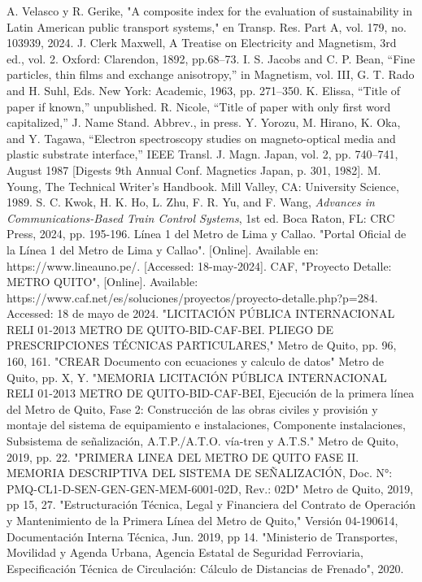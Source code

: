 \documentclass[conference]{IEEEtran}
\begin{document}
\begin{thebibliography}{00}
 A. Velasco y R. Gerike, "A composite index for the evaluation of sustainability in Latin American public transport systems," en Transp. Res. Part A, vol. 179, no. 103939, 2024. 
 J. Clerk Maxwell, A Treatise on Electricity and Magnetism, 3rd ed., vol. 2. Oxford: Clarendon, 1892, pp.68--73.
 I. S. Jacobs and C. P. Bean, ``Fine particles, thin films and exchange anisotropy,'' in Magnetism, vol. III, G. T. Rado and H. Suhl, Eds. New York: Academic, 1963, pp. 271--350.
 K. Elissa, ``Title of paper if known,'' unpublished.
 R. Nicole, ``Title of paper with only first word capitalized,'' J. Name Stand. Abbrev., in press.
 Y. Yorozu, M. Hirano, K. Oka, and Y. Tagawa, ``Electron spectroscopy studies on magneto-optical media and plastic substrate interface,'' IEEE Transl. J. Magn. Japan, vol. 2, pp. 740--741, August 1987 [Digests 9th Annual Conf. Magnetics Japan, p. 301, 1982].
 M. Young, The Technical Writer's Handbook. Mill Valley, CA: University Science, 1989.
 S. C. Kwok, H. K. Ho, L. Zhu, F. R. Yu, and F. Wang, \textit{Advances in Communications-Based Train Control Systems}, 1st ed. Boca Raton, FL: CRC Press, 2024, pp. 195-196.
 Línea 1 del Metro de Lima y Callao. "Portal Oficial de la Línea 1 del Metro de Lima y Callao". [Online]. Available en: https://www.lineauno.pe/. [Accessed: 18-may-2024].
 CAF, "Proyecto Detalle: METRO QUITO", [Online]. Available: https://www.caf.net/es/soluciones/proyectos/proyecto-detalle.php?p=284. Accessed: 18 de mayo de 2024.
 "LICITACIÓN PÚBLICA INTERNACIONAL RELI 01-2013 METRO DE QUITO-BID-CAF-BEI. PLIEGO DE PRESCRIPCIONES TÉCNICAS PARTICULARES," Metro de Quito, pp. 96, 160, 161.
 "CREAR Documento con ecuaciones y calculo de datos" Metro de Quito, pp. X, Y.
 "MEMORIA LICITACIÓN PÚBLICA INTERNACIONAL RELI 01-2013 METRO DE QUITO-BID-CAF-BEI, Ejecución de la primera línea del Metro de Quito, Fase 2: Construcción de las obras civiles y provisión y montaje del sistema de equipamiento e instalaciones, Componente instalaciones, Subsistema de señalización, A.T.P./A.T.O. vía-tren y A.T.S." Metro de Quito, 2019, pp. 22.
 "PRIMERA LINEA DEL METRO DE QUITO FASE II. MEMORIA DESCRIPTIVA DEL SISTEMA DE SEÑALIZACIÓN, Doc. N°: PMQ-CL1-D-SEN-GEN-GEN-MEM-6001-02D, Rev.: 02D" Metro de Quito, 2019, pp 15, 27.
 "Estructuración Técnica, Legal y Financiera del Contrato de Operación y Mantenimiento de la Primera Línea del Metro de Quito," Versión 04-190614, Documentación Interna Técnica, Jun. 2019, pp 14.
 "Ministerio de Transportes, Movilidad y Agenda Urbana, Agencia Estatal de Seguridad Ferroviaria, Especificación Técnica de Circulación: Cálculo de Distancias de Frenado", 2020.


\end{thebibliography}
\end{document}
